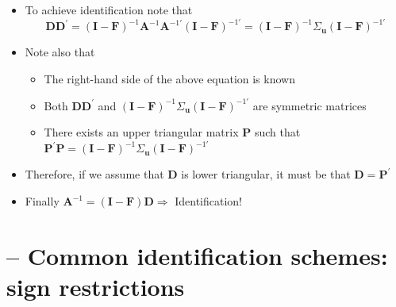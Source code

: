 \documentclass[10pt,handout]{beamer}
\begin{document}
\begin{frame}
\begin{itemize}
\item To achieve identification note that%
\begin{equation*}
\mathbf{DD}^{\prime }=\left( \mathbf{I}-\mathbf{F}\right) ^{-1}\mathbf{A}%
^{-1}\mathbf{A}^{-1\prime }\left( \mathbf{I}-\mathbf{F}\right) ^{-1\prime
}=\left( \mathbf{I}-\mathbf{F}\right) ^{-1}\Sigma _{\mathbf{u}}\left( 
\mathbf{I}-\mathbf{F}\right) ^{-1\prime }
\end{equation*}%
\pause

\item Note also that

\begin{itemize}
\item The right-hand side of the above equation is known

\item Both $\mathbf{DD}^{\prime }$ and $\left( \mathbf{I}-\mathbf{F}\right)
^{-1}\Sigma _{\mathbf{u}}\left( \mathbf{I}-\mathbf{F}\right) ^{-1\prime }$
are symmetric matrices

\item There exists an upper triangular matrix $\mathbf{P}$ such that $%
\mathbf{P}^{\prime }\mathbf{P=}\left( \mathbf{I}-\mathbf{F}\right)
^{-1}\Sigma _{\mathbf{u}}\left( \mathbf{I}-\mathbf{F}\right) ^{-1\prime }$%
\medskip \pause
\end{itemize}

\item Therefore, if we assume that $\mathbf{D}$ is lower triangular, it must
be that $\mathbf{D=P}^{\prime }$\medskip \pause

\item Finally $\mathbf{A}^{-1}=\left( \mathbf{I}-\mathbf{F}\right) \mathbf{D}%
\Longrightarrow $ Identification!
\end{itemize}
\end{frame}

\vspace{.1cm}

\section{ -- Common identification schemes: sign restrictions}
\end{document}

